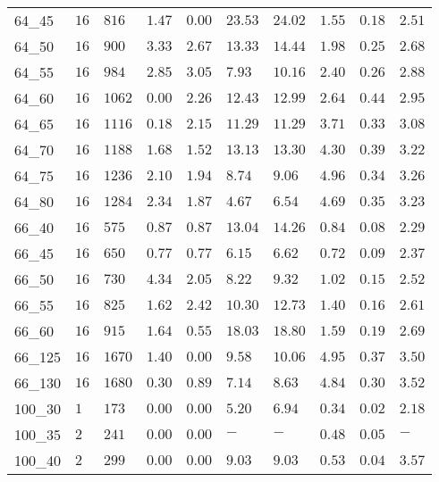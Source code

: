 \begin{center}
\begin{table}[]
\begin{adjustwidth}{-0.4in}{-1in}
\begin{tabular}{|lll|l|l|ll|lll|}
\hline
64\_45   & $16  $ & $816 $ & $1.47  $ & $\bm{0.00}$ & $23.53$ & $24.02$ & $1.55  $ & $0.18    $ & $2.51     $ \\
64\_50   & $16  $ & $900 $ & $3.33  $ & $2.67$ & $13.33$ & $14.44$ & $1.98  $ & $0.25    $ & $2.68     $ \\
64\_55   & $16  $ & $984 $ & $2.85  $ & $3.05$ & $7.93 $ & $10.16$ & $2.40  $ & $0.26    $ & $2.88     $ \\
64\_60   & $16  $ & $1062$ & $\bm{0.00}  $ & $2.26$ & $12.43$ & $12.99$ & $2.64  $ & $0.44    $ & $2.95     $ \\
64\_65   & $16  $ & $1116$ & $0.18  $ & $2.15$ & $11.29$ & $11.29$ & $3.71  $ & $0.33    $ & $3.08     $ \\
64\_70   & $16  $ & $1188$ & $1.68  $ & $1.52$ & $13.13$ & $13.30$ & $4.30  $ & $0.39    $ & $3.22     $ \\
64\_75   & $16  $ & $1236$ & $2.10  $ & $1.94$ & $8.74 $ & $9.06 $ & $4.96  $ & $0.34    $ & $3.26     $ \\
64\_80   & $16  $ & $1284$ & $2.34  $ & $1.87$ & $4.67 $ & $6.54 $ & $4.69  $ & $0.35    $ & $3.23     $ \\
\hline
66\_40   & $16  $ & $575 $ & $0.87  $ & $0.87$ & $13.04$ & $14.26$ & $0.84  $ & $0.08    $ & $2.29     $ \\
66\_45   & $16  $ & $650 $ & $0.77  $ & $0.77$ & $6.15 $ & $6.62 $ & $0.72  $ & $0.09    $ & $2.37     $ \\
66\_50   & $16  $ & $730 $ & $4.34  $ & $2.05$ & $8.22 $ & $9.32 $ & $1.02  $ & $0.15    $ & $2.52     $ \\
66\_55   & $16  $ & $825 $ & $1.62  $ & $2.42$ & $10.30$ & $12.73$ & $1.40  $ & $0.16    $ & $2.61     $ \\
66\_60   & $16  $ & $915 $ & $1.64  $ & $0.55$ & $18.03$ & $18.80$ & $1.59  $ & $0.19    $ & $2.69     $ \\
66\_125  & $16  $ & $1670$ & $1.40  $ & $\bm{0.00}$ & $9.58 $ & $10.06$ & $4.95  $ & $0.37    $ & $3.50     $ \\
66\_130  & $16  $ & $1680$ & $0.30  $ & $0.89$ & $7.14 $ & $8.63 $ & $4.84  $ & $0.30    $ & $3.52     $ \\
\hline
100\_30  & $1   $ & $173 $ & $\bm{0.00}  $ & $\bm{0.00}$ & $5.20 $ & $6.94 $ & $0.34  $ & $0.02    $ & $2.18     $ \\
100\_35  & $2   $ & $241 $ & $\bm{0.00}  $ & $\bm{0.00}$ & $-    $ & $-    $ & $0.48  $ & $0.05    $ & $-        $ \\
100\_40  & $2   $ & $299 $ & $\bm{0.00}  $ & $\bm{0.00}$ & $9.03 $ & $9.03 $ & $0.53  $ & $0.04    $ & $3.57     $ \\

\end{tabular}
\end{adjustwidth}
\end{table}
\end{center}
